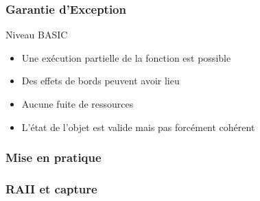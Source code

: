 \documentclass[svgnames]{beamer}
\begin{document}
\frame
{
  \frametitle{Garantie d'Exception}
  \begin{block}{Niveau BASIC}
  \begin{itemize}
  \item Une exécution partielle de la fonction est possible
  \item Des effets de bords peuvent avoir lieu
  \item Aucune fuite de ressources
  \item L'état de l'objet est valide mais pas forcément cohérent
  \end{itemize}
  \end{block}
}

\frame
{
  \frametitle{Mise en pratique}
  \begin{overlayarea}{\textwidth}{5cm}
  \end{overlayarea}
}

\frame
{
  \frametitle{RAII et capture}
}
\end{document}
